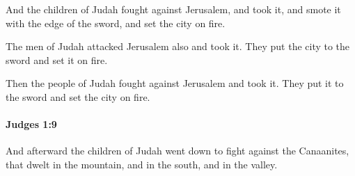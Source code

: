 			\begin{versebox}
					\item[BHS] 
					\item[ASV] And the children of Judah fought against Jerusalem, and took it, and smote it with the edge of the sword, and set the city on fire.
					\item[NIV] The men of Judah attacked Jerusalem also and took it. They put the city to the sword and set it on fire.
					\item[NRSV] Then the people of Judah fought against Jerusalem and took it. They put it to the sword and set the city on fire.
			\end{versebox}

		\paragraph{Judges 1:9} %
			\label{JUDGES-1-9}

			And afterward the children of Judah went down to fight against the Canaanites, that dwelt in the mountain, and in the south, and in the valley.

